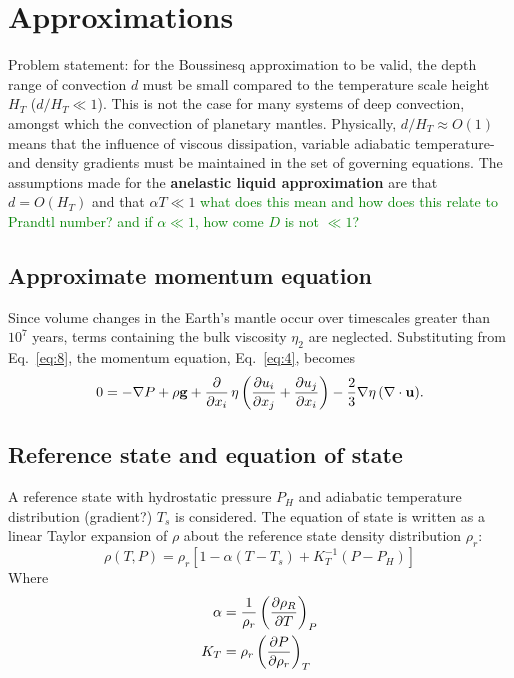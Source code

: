 \documentclass[document.tex]{subfiles}
\begin{document}
\section{\cite{jamc80} Approximations}
Problem statement: for the Boussinesq approximation to be valid, the depth range of convection $d$ must be 
small compared to the temperature scale height $H_T$ ($d/H_T \ll 1$). This is not the case for many systems of 
deep convection, amongst which the convection of planetary mantles. Physically, $d/H_T \approx O(1)$ means that 
the influence of viscous dissipation, variable adiabatic temperature- and density gradients must be maintained in the 
set of governing equations. 
\newline
The assumptions made for the \textbf{anelastic liquid approximation} are that $d=O(H_T)$ and that $\alpha T \ll 1$
\textcolor{green}{what does this mean and how does this relate to Prandtl number? 
and if $\alpha \ll 1$, how come $D$ is not $\ll 1$?} 

\subsection{Approximate momentum equation}
Since volume changes in the Earth's mantle occur over timescales greater than $10^7$ years, terms containing the bulk viscosity 
$\eta_2$ are neglected. Substituting from Eq.~\eqref{eq:8}, the momentum equation, Eq.~\eqref{eq:4}, becomes
\begin{align} \label{eq:9}
    0 = -\nabla P + \rho \mathbf{g} + \pdv{x_i}\, \eta \left( \pdv{u_i}{x_j} + \pdv{u_j}{x_i} \right) - \frac{2}{3} \nabla \eta \, (\nabla \cdot \mathbf{u}).
\end{align}
\subsection{Reference state and equation of state}
A reference state with hydrostatic pressure $P_H$ and adiabatic temperature distribution (gradient?) $T_s$ is considered. 
The equation of state is written as a linear Taylor expansion of $\rho$ about the reference state density distribution $\rho_r$: 
\begin{equation} \label{eq:11}
    \rho(T,P) = \rho_r[1-\alpha(T-T_s)+K_T^{-1}(P-P_H)]
\end{equation}
Where 
\begin{align}
    \alpha &= \frac{1}{\rho_r} \left(\pdv{\rho_R}{T}\right)_P \\
    K_T &= \rho_r \left(\pdv{P}{\rho_r}\right)_T 
\end{align}
\end{document}

